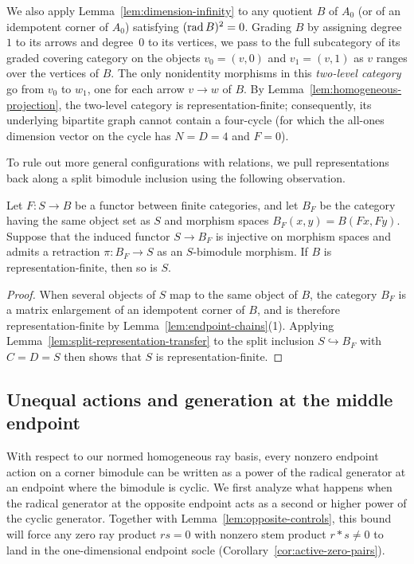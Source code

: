 We also apply Lemma~\ref{lem:dimension-infinity} to any quotient $B$ of $A_0$ (or of an idempotent corner of $A_0$) satisfying $(\operatorname{rad} B)^2=0$. Grading $B$ by assigning degree~$1$ to its arrows and degree~$0$ to its vertices, we pass to the full subcategory of its graded covering category on the objects $v_0=(v,0)$ and $v_1=(v,1)$ as $v$ ranges over the vertices of $B$. The only nonidentity morphisms in this \emph{two-level category} go from $v_0$ to $w_1$, one for each arrow $v\to w$ of $B$. By Lemma~\ref{lem:homogeneous-projection}, the two-level category is representation-finite; consequently, its underlying bipartite graph cannot contain a four-cycle (for which the all-ones dimension vector on the cycle has $N=D=4$ and $F=0$).

To rule out more general configurations with relations, we pull representations back along a split bimodule inclusion using the following observation.

\begin{lemma}
\label{lem:representation-transfer}
Let $F\colon S\to B$ be a functor between finite categories, and let $B_F$ be the category having the same object set as $S$ and morphism spaces $B_F(x,y)=B(Fx,Fy)$. Suppose that the induced functor $S\to B_F$ is injective on morphism spaces and admits a retraction $\pi\colon B_F\to S$ as an $S$-bimodule morphism. If $B$ is representation-finite, then so is $S$.
\end{lemma}
\begin{proof}
When several objects of $S$ map to the same object of $B$, the category $B_F$ is a matrix enlargement of an idempotent corner of $B$, and is therefore representation-finite by Lemma~\ref{lem:endpoint-chains}(1). Applying Lemma~\ref{lem:split-representation-transfer} to the split inclusion $S\hookrightarrow B_F$ with $C=D=S$ then shows that $S$ is representation-finite.
\end{proof}

\subsection{Unequal actions and generation at the middle endpoint}

With respect to our normed homogeneous ray basis, every nonzero endpoint action on a corner bimodule can be written as a power of the radical generator at an endpoint where the bimodule is cyclic. We first analyze what happens when the radical generator at the opposite endpoint acts as a second or higher power of the cyclic generator. Together with Lemma~\ref{lem:opposite-controls}, this bound will force any zero ray product $rs=0$ with nonzero stem product $r*s\ne0$ to land in the one-dimensional endpoint socle (Corollary~\ref{cor:active-zero-pairs}).

